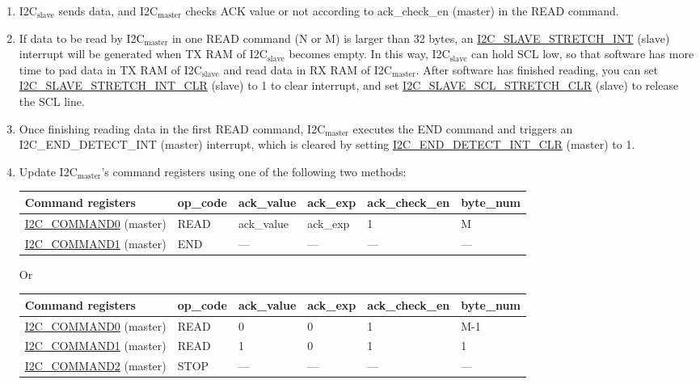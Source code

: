 \documentclass[main\_\_EN.tex]{subfiles}
\begin{document}
\begin{enumerate}
\item I2C$_\text{slave}$ sends data, and I2C$_\text{master}$ checks ACK value or not according to ack\_check\_en (master) in the READ command.
\item If data to be read by I2C$_\text{master}$ in one READ command (N or M) is larger than 32 bytes, an \hyperref[int:i2c-slave-stretch]{I2C\_SLAVE\_STRETCH\_INT} (slave) interrupt will be generated when TX RAM of I2C$_\text{slave}$ becomes empty. In this way, I2C$_\text{slave}$ can hold SCL low, so that software has more time to pad data in TX RAM of I2C$_\text{slave}$ and read data in RX RAM of I2C$_\text{master}$. After software has finished reading, you can set \hyperref[fielddesc:I2CSLAVESTRETCHINTCLR]{I2C\_SLAVE\_STRETCH\_INT\_CLR} (slave) to 1 to clear interrupt, and set \hyperref[fielddesc:I2CSLAVESCLSTRETCHCLR]{I2C\_SLAVE\_SCL\_STRETCH\_CLR} (slave) to release the SCL line.
\item Once finishing reading data in the first READ command, I2C$_\text{master}$ executes the END command and triggers an I2C\_END\_DETECT\_INT (master) interrupt, which is cleared by setting \hyperref[fielddesc:I2CENDDETECTINTCLR]{I2C\_END\_DETECT\_INT\_CLR} (master) to 1.
\item Update I2C$_\text{master}$'s command registers using one of the following two methods:
\begin{longtable}{ | p{4cm} | p{2cm} | p{2cm} | p{2cm} |p{2cm} | p{2cm} |}
\hline\rowcolor{lightgray}
Command registers & op\_code & ack\_value&ack\_exp&ack\_check\_en&byte\_num  \\ \hline
\hyperref[fielddesc:I2CCOMMAND0]{I2C\_COMMAND0} (master)& READ& ack\_value&ack\_exp&1&M  \\ \hline
\hyperref[fielddesc:I2CCOMMAND1]{I2C\_COMMAND1} (master)& END& ---&---&---&---  \\ \hline
\end{longtable} 
Or
\begin{longtable}{ | p{4cm} | p{2cm} | p{2cm} | p{2cm} |p{2cm} | p{2cm} |}
\hline\rowcolor{lightgray}
Command registers & op\_code & ack\_value&ack\_exp&ack\_check\_en&byte\_num  \\ \hline
\hyperref[fielddesc:I2CCOMMAND0]{I2C\_COMMAND0} (master)& READ& 0&0&1&M-1  \\ \hline
\hyperref[fielddesc:I2CCOMMAND1]{I2C\_COMMAND1} (master)& READ& 1&0&1&1  \\ \hline
\hyperref[fielddesc:I2CCOMMAND2]{I2C\_COMMAND2} (master)& STOP& ---&---&---&---  \\ \hline
\end{longtable} 


\end{enumerate}
\end{document}
